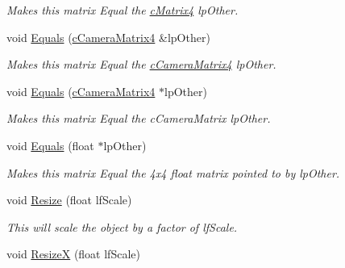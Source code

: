 \begin{DoxyCompactItemize}
\begin{DoxyCompactList}\small\item\em Makes this matrix Equal the \hyperlink{classc_matrix4}{cMatrix4} lpOther. \end{DoxyCompactList}\item 
\hypertarget{classc_matrix4_a0af5e0b1dbbe6d7f4c512a5f07f1e273}{
void \hyperlink{classc_matrix4_a0af5e0b1dbbe6d7f4c512a5f07f1e273}{Equals} (\hyperlink{classc_camera_matrix4}{cCameraMatrix4} \&lpOther)}
\label{classc_matrix4_a0af5e0b1dbbe6d7f4c512a5f07f1e273}

\begin{DoxyCompactList}\small\item\em Makes this matrix Equal the \hyperlink{classc_camera_matrix4}{cCameraMatrix4} lpOther. \end{DoxyCompactList}\item 
\hypertarget{classc_matrix4_a12b028ad76a776c5a01d695ea620962b}{
void \hyperlink{classc_matrix4_a12b028ad76a776c5a01d695ea620962b}{Equals} (\hyperlink{classc_camera_matrix4}{cCameraMatrix4} $\ast$lpOther)}
\label{classc_matrix4_a12b028ad76a776c5a01d695ea620962b}

\begin{DoxyCompactList}\small\item\em Makes this matrix Equal the cCameraMatrix lpOther. \end{DoxyCompactList}\item 
\hypertarget{classc_matrix4_adb76264fa82ef10ebb24b64d6293bc9d}{
void \hyperlink{classc_matrix4_adb76264fa82ef10ebb24b64d6293bc9d}{Equals} (float $\ast$lpOther)}
\label{classc_matrix4_adb76264fa82ef10ebb24b64d6293bc9d}

\begin{DoxyCompactList}\small\item\em Makes this matrix Equal the 4x4 float matrix pointed to by lpOther. \end{DoxyCompactList}\item 
\hypertarget{classc_matrix4_a4785b8464f65d9784db634f3a6f34e52}{
void \hyperlink{classc_matrix4_a4785b8464f65d9784db634f3a6f34e52}{Resize} (float lfScale)}
\label{classc_matrix4_a4785b8464f65d9784db634f3a6f34e52}

\begin{DoxyCompactList}\small\item\em This will scale the object by a factor of lfScale. \end{DoxyCompactList}\item 
\hypertarget{classc_matrix4_a6f721212ba596c5e80f85eba5b70766d}{
void \hyperlink{classc_matrix4_a6f721212ba596c5e80f85eba5b70766d}{ResizeX} (float lfScale)}
\label{classc_matrix4_a6f721212ba596c5e80f85eba5b70766d}


\end{DoxyCompactItemize}
